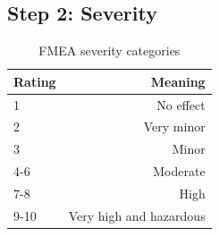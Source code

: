 \subsection*{Step 2: Severity}

\begin{table}[h]
\centering
    \begin{tabular}{ | l | r | }
    \hline
    Rating & Meaning \\ \hline \hline
    1      & No effect  \\ \hline
    2      & Very minor \\ \hline
    3      & Minor \\ \hline
    4-6    & Moderate \\ \hline
    7-8    & High \\ \hline
    9-10   & Very high and hazardous \\ \hline
    \end{tabular}
\caption{FMEA severity categories}
\label{table:fmea_severities}
\end{table}


